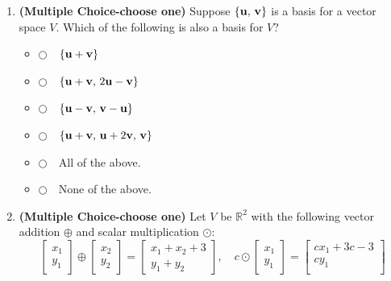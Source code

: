 \documentclass[12pt]{extarticle}
\newcommand{\chooseone}{{\Large$\Circle$\ \ }}
\begin{document}
\begin{enumerate}
\begin{enumerate}[label=\alph*.]
\vfill

\vfill


\item \textbf{(Multiple Choice-choose one)} Suppose $\{{\mathbf{u}},\,{\mathbf{v}}\}$ is a basis for a vector space $V$. Which of the following is also a basis for $V$?
\begin{itemize}[label={}]
\item \chooseone $\{{\mathbf{u}}+{\mathbf{v}}\}$\medskip
\item \chooseone $\{{\mathbf{u}}+{\mathbf{v}},\,2{\mathbf{u}}-{\mathbf{v}}\}$\medskip
\item \chooseone $\{{\mathbf{u}}-{\mathbf{v}},\,{\mathbf{v}}-{\mathbf{u}}\}$\medskip
\item \chooseone $\{{\mathbf{u}}+{\mathbf{v}},\,{\mathbf{u}}+2{\mathbf{v}},\,{\mathbf{v}}\}$\medskip
\item \chooseone All of the above.\medskip
\item \chooseone None of the above.
\end{itemize}
\vfill


\item \textbf{(Multiple Choice-choose one)} Let $V$ be $\mathbb{R}^2$ with the following vector addition $\oplus$ and scalar multiplication $\odot$:
    $$\begin{bmatrix} x_1 \\ y_1 \end{bmatrix}\oplus \begin{bmatrix} x_2 \\ y_2 \end{bmatrix}=\begin{bmatrix} x_1+x_2+3 \\ y_1+y_2 \end{bmatrix}, \quad c\odot\begin{bmatrix} x_1 \\ y_1 \end{bmatrix}=\begin{bmatrix} cx_1+3c-3 \\ cy_1\\\end{bmatrix}$$


\end{enumerate}
\end{enumerate}
\end{document}
